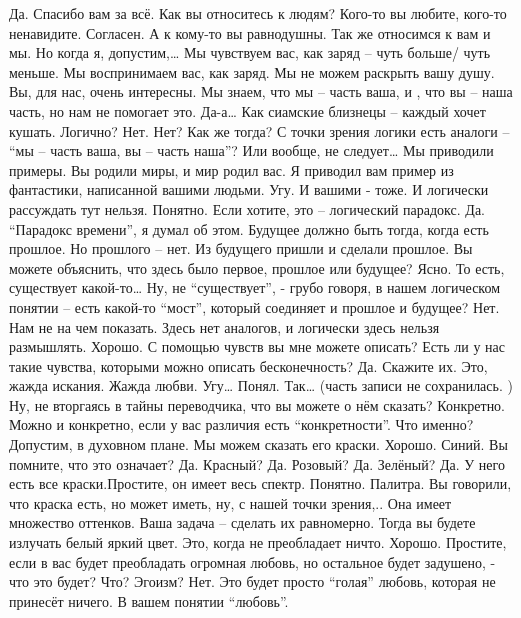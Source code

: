 \documentclass{extbook}
\newcommand{\soul}[1]{{#1}}
\newcommand{\people}[1]{{#1}}
\newcommand{\comment}[1]{{#1}}
\begin{document}
\soul{Да.}
\people{Спасибо вам за всё.}
\soul{Как вы относитесь к людям? Кого-то вы любите, кого-то ненавидите.}
\people{Согласен.}
\soul{А к кому-то вы равнодушны. Так же относимся к вам и мы.}
\people{Но когда я, допустим,…}
\soul{Мы чувствуем вас, как заряд – чуть больше/ чуть меньше. Мы воспринимаем вас, как заряд. Мы не можем раскрыть вашу душу. Вы, для нас, очень интересны. Мы знаем, что мы – часть ваша, и , что вы – наша часть, но нам не помогает это.}
\people{Да-а… Как сиамские близнецы – каждый хочет кушать. Логично?}
\soul{Нет.}
\people{Нет? Как же тогда? С точки зрения логики есть аналоги – ``мы – часть ваша, вы – часть наша''? Или вообще, не следует…}
\soul{Мы приводили примеры. Вы родили миры, и мир родил вас. Я приводил вам пример из фантастики, написанной вашими людьми.}
\people{Угу. И вашими - тоже.}
\soul{И логически рассуждать тут нельзя.}
\people{Понятно.}
\soul{Если хотите, это – логический парадокс.}
\people{Да. ``Парадокс времени'', я думал об этом.}
\soul{Будущее должно быть тогда, когда есть прошлое. Но прошлого – нет. Из будущего пришли и сделали прошлое. Вы можете объяснить, что здесь было первое, прошлое или будущее?}
\people{Ясно. То есть, существует какой-то… Ну, не ``существует'', - грубо говоря, в нашем логическом понятии – есть какой-то ``мост'', который соединяет и прошлое и будущее?}
\soul{Нет. Нам не на чем показать. Здесь нет аналогов, и логически здесь нельзя размышлять.}
\people{Хорошо. С помощью чувств вы мне можете описать? Есть ли у нас такие чувства, которыми можно описать бесконечность?}
\soul{Да.}
\people{Скажите их.}
\soul{Это, жажда искания. Жажда любви.}
\people{Угу… Понял. Так…}
\comment{(часть записи не сохранилась. )}
\people{Ну, не вторгаясь в тайны переводчика, что вы можете о нём сказать?}
\soul{Конкретно.}
\people{ Можно и конкретно, если у вас  различия есть ``конкретности''.}
\soul{Что именно?}
\people{ Допустим, в духовном плане.}
\soul{Мы можем сказать  его краски.}
\people{Хорошо.}
\soul{Синий. Вы помните, что это  означает?}
\people{Да.}
\soul{Красный?}
\people{Да.}
\soul{Розовый?}
\people{Да.}
\soul{Зелёный?}
\people{Да.}
\soul{У него есть все краски.Простите, он имеет  весь спектр.}
\people{Понятно.  Палитра. Вы говорили, что краска есть, но может иметь, ну,  с нашей точки зрения,..}
\soul{Она имеет множество оттенков. Ваша задача – сделать их равномерно. Тогда вы будете излучать белый яркий цвет. Это, когда не преобладает ничто.}
\people{Хорошо.}
\soul{Простите, если в вас будет преобладать огромная любовь, но остальное будет задушено, - что это будет?}
\people{Что? Эгоизм?}
\soul{Нет. Это будет просто ``голая'' любовь, которая не принесёт ничего. В вашем понятии ``любовь''.}
\end{document}
